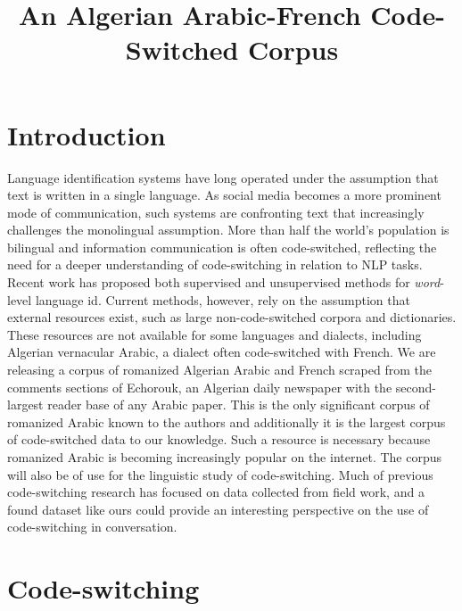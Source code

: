 \documentclass[10pt, a4paper]{article}
\title{An Algerian Arabic-French Code-Switched Corpus}
\begin{document}


\maketitleabstract


\section{Introduction}
Language identification systems have long operated under the
assumption that text is written in a single language. As social media
becomes a more prominent mode of communication, such systems are
confronting text that increasingly challenges the monolingual
assumption. More than half the world's population is bilingual and
information communication is often code-switched, reflecting the need
for a deeper understanding of code-switching in relation to NLP
tasks. Recent work has proposed both supervised and unsupervised
methods for \textit{word}-level language id. Current methods, however,
rely on the assumption that external resources exist, such as large
non-code-switched corpora and dictionaries. These resources are not
available for some languages and dialects, including Algerian vernacular
Arabic, a dialect often code-switched with French. We are releasing a
corpus of romanized Algerian Arabic and French scraped from the
comments sections of Echorouk, an Algerian daily newspaper with the
second-largest reader base of any Arabic paper. This is the only
significant corpus of romanized Arabic known to the authors and
additionally it is the largest corpus of code-switched data to our
knowledge. Such a resource is necessary because romanized Arabic is
becoming increasingly popular on the internet. The corpus will also be
of use for the linguistic study of code-switching. Much of previous
code-switching research has focused on data collected from field work,
and a found dataset like ours could provide an interesting perspective
on the use of code-switching in conversation.

\section{Code-switching}
\end{document}
